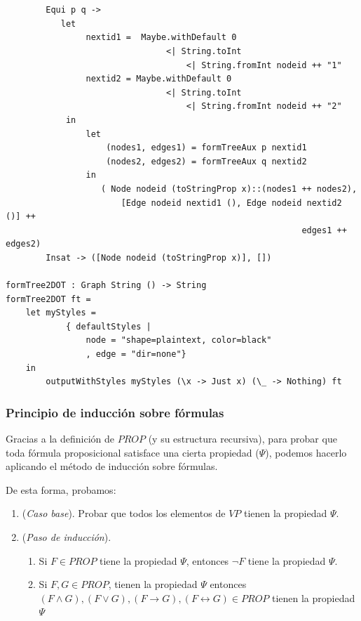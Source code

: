\documentclass[a4paper]{report}
\begin{document}
\begin{lstlisting}[caption= Definición de las funciones \textit{formTree} y \textit{formTree2DOT}]
        
        
        Equi p q -> 
           let 
                nextid1 =  Maybe.withDefault 0 
                                <| String.toInt 
                                    <| String.fromInt nodeid ++ "1"
                nextid2 = Maybe.withDefault 0 
                                <| String.toInt 
                                    <| String.fromInt nodeid ++ "2"
            in
                let 
                    (nodes1, edges1) = formTreeAux p nextid1
                    (nodes2, edges2) = formTreeAux q nextid2
                in
                   ( Node nodeid (toStringProp x)::(nodes1 ++ nodes2),  
                       [Edge nodeid nextid1 (), Edge nodeid nextid2 ()] ++ 
                                                           edges1 ++ edges2)
        Insat -> ([Node nodeid (toStringProp x)], [])
        
formTree2DOT : Graph String () -> String
formTree2DOT ft =
    let myStyles =
            { defaultStyles | 
                node = "shape=plaintext, color=black"
                , edge = "dir=none"}
    in 
        outputWithStyles myStyles (\x -> Just x) (\_ -> Nothing) ft
\end{lstlisting}

\subsubsection{Principio de inducción sobre fórmulas}

Gracias a la definición de $PROP$ (y su estructura recursiva), para probar que toda fórmula proposicional satisface una cierta propiedad ($\Psi$), podemos hacerlo aplicando el método de inducción sobre fórmulas.

De esta forma, probamos:

\begin{enumerate}
\item (\textit{Caso base}). Probar que todos los elementos de $VP$ tienen la propiedad $\Psi$.
\item (\textit{Paso de inducción}).
\begin{enumerate}
\item Si $F \in PROP$ tiene la propiedad $\Psi$, entonces $\neg F$ tiene la propiedad $\Psi$.
\item Si $F, G \in PROP$, tienen la propiedad $\Psi$ entonces  $(F \wedge G), (F \vee G), (F \rightarrow G), (F \leftrightarrow G) \in PROP$ tienen la propiedad $\Psi$
\end{enumerate}
\end{enumerate}
\end{document}
